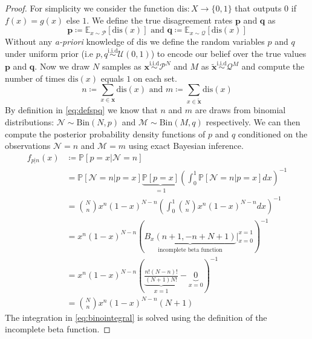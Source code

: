 \begin{proof}
    For simplicity we consider the function $\text{dis}: X\to \{0,1\}$ that outputs $0$ if $f(x)=g(x)$ else $1$.
    We define the true disagreement rates $\textbf{p}$ and $\textbf{q}$ as
    \begin{equation}
        \mathbf{p} \coloneqq \mathbb{E}_{x\sim \mathcal{P}}[\text{dis}(x)]\text{ and } \mathbf{q} \coloneqq \mathbb{E}_{x\sim \mathcal{Q}}[\text{dis}(x)]
        \label{eq:defspq}
    \end{equation}
    Without any \textit{a-priori} knowledge of $\text{dis}$ we define the random variables $p$ and $q$ under uniform prior (i.e $p,q\overset{\text{i.i.d}}{\sim}\mathcal{U}(0,1)$) to encode our belief over the true values $\mathbf{p}$ and $\mathbf{q}$.
    Now we draw $N$ samples as $\mathbf{x} \overset{\text{i.i.d}}{\sim} \mathcal{P}^N$ and $M$ as $\tilde{\mathbf{x}} \overset{\text{i.i.d}}{\sim} \mathcal{Q}^M$ and compute the number of times $\text{dis}(x)$ equals $1$ on each set.
    \begin{equation}
    {n}
        \coloneqq \sum_{x\in \mathbf{x} } \text{dis}(x) \text{ and } {m}\coloneqq \sum_{x\in \tilde{\mathbf{x}} } \text{dis}(x)
        \label{eq:bayes_result}
    \end{equation}
    By definition in \autoref{eq:defspq} we know that $n$ and $m$ are draws from binomial distributions: $\mathcal{N}\sim \text{Bin}(N,p)$ and $\mathcal{M} \sim \text{Bin}(M,q)$ respectively.
    We can then compute the posterior probability density functions of $p$ and $q$ conditioned on the observations $\mathcal{N}=n$ and $\mathcal{M}=m$ using exact Bayesian inference.
    \begin{align}
        f_{p| {n}}(x)&\coloneqq \mathbb{P}[p = x | \mathcal{N}={n}] \\
        &= \mathbb{P}[\mathcal{N} = {n} | p = x] \underbrace{\mathbb{P}[p = x]}_{=1} \left(\int_{0}^1 \mathbb{P}[\mathcal{N}={n}|p=x] dx\right)^{-1}\\
        &={\binom{N}{n}} x^{n} (1-x)^{N-{n}}  \left(\int_0^1 {\binom{N}{n}} x^{n} (1-x)^{N-{n}} dx \right)^{-1}\label{eq:binointegral} \\
        &= x^{n} (1-x)^{N-{n}}  \left(\underbrace{B_x(n+1,-n+N+1)}_{\text{incomplete beta function}}\left. \right\rvert_{x=0}^{x=1}\right)^{-1} \\
        &=x^{n} (1-x)^{N-{n}}\left(\underbrace{\frac{n! (N-n)!}{(N+1) N!}}_{x=1} - \underbrace{0}_{x=0}\right)^{-1}\\
        &= \binom{N}{n} x^{n} (1-x)^{N-{n}} (N+1)
    \end{align}
    The integration in \autoref{eq:binointegral} is solved using the definition of the incomplete beta function.


\end{proof}
